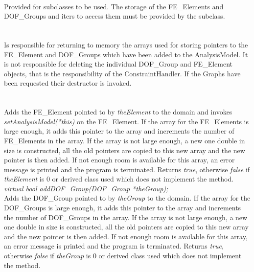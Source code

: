   \\
Provided for subclasses to be used. The storage of the FE\_Elements
and DOF\_Groups and iters to access them must be provided by the
subclass. \\

  \\
  \\
Is responsible for returning to memory the arrays used for storing
pointers to the FE\_Element and DOF\_Groups which have been added to
the AnalysisModel. It is not responsible for deleting the individual
DOF\_Group and FE\_Element objects, that is the responsibility of the
ConstraintHandler. If the Graphs have been requested their destructor
is invoked.\\ 

  \\
  \\
Adds the FE\_Element pointed to by {\em theElement} to the domain and
invokes {\em setAnalysisModel(*this)} on the FE\_Element. If the
array for the FE\_Elements is large enough, it adds this pointer to
the array and increments the number of FE\_Elements in the array. If
the array is not large enough, a new one double in size is
constructed, all the old pointers are copied to this new array and the
new pointer is then added. If not enough room is available for this
array, an error message is printed and the program is
terminated. Returns {\em true}, otherwise {\em false} if {\em
theElement} is $0$ or derived class used which does not implement the
method. \\ 

{\em virtual bool addDOF\_Group(DOF\_Group *theGroup);}  \\
Adds the DOF\_Group pointed to by {\em theGroup} to the domain. If the
array for the DOF\_Groups is large enough, it adds this pointer to
the array and increments the number of DOF\_Groups in the array. If
the array is not large enough, a new one double in size is
constructed, all the old pointers are copied to this new array and the
new pointer is then added. If not enough room is available for this
array, an error message is printed and the program is
terminated. Returns {\em true}, otherwise {\em false} if {\em
theGroup} is $0$ or derived class used which does not implement the
method. \\ 



